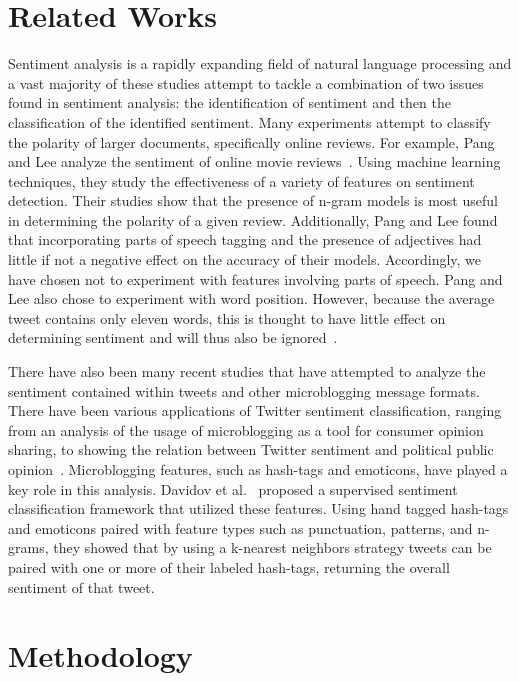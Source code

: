 \documentclass[11pt]{article}
\begin{document}
\section{Related Works}
Sentiment analysis is a rapidly expanding field of natural language processing and a vast majority of these studies attempt to tackle a combination of two issues found in sentiment analysis: the identification of sentiment and then the classification of the identified sentiment.  Many experiments attempt to classify the polarity of larger documents, specifically online reviews. For example, Pang and Lee analyze the sentiment of online movie reviews~\cite{pang2002thumbs}. Using machine learning techniques, they study the effectiveness of a variety of features on sentiment detection. Their studies show that the presence of n-gram models is most useful in determining the polarity of a given review. Additionally, Pang and Lee found that incorporating parts of speech tagging and the presence of adjectives had little  if not a negative effect on the accuracy of their models. Accordingly, we have chosen not to experiment with features involving parts of speech. Pang and Lee also chose to experiment with word position. However, because the average tweet contains only eleven words, this is thought to have little effect on determining sentiment and will thus also be ignored~\cite{oconnor2010tweets}.

There have also been many recent studies that have attempted to analyze the sentiment contained within tweets and other microblogging message formats. There have been various applications of Twitter sentiment classification, ranging from an analysis of the usage of microblogging as a tool for consumer opinion sharing, to showing the relation between Twitter sentiment and political public opinion~\cite{jansen2009twitter,oconnor2010tweets}. Microblogging features, such as hash-tags and emoticons, have played a key role in this analysis. Davidov et al.~ proposed a supervised sentiment classification framework that utilized these features. Using hand tagged hash-tags and emoticons paired with feature types such as punctuation, patterns, and n-grams, they showed that by using a k-nearest neighbors strategy tweets can be paired with one or more of their labeled hash-tags, returning the overall sentiment of that tweet. 
\section{Methodology}
\end{document}
